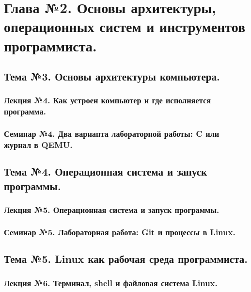 \part{Глава №2. Основы архитектуры, операционных систем и инструментов программиста.}

\chapter{Тема №3. Основы архитектуры компьютера.}
\section{Лекция №4. Как устроен компьютер и где исполняется программа.}

\begingroup
\setlength{\emergencystretch}{2em}


\endgroup


\newpage
\section{Семинар №4. Два варианта лабораторной работы: C или журнал в QEMU.}


\newpage
\chapter{Тема №4. Операционная система и запуск программы.}
\section{Лекция №5. Операционная система и запуск программы.}
\begingroup
\setlength{\emergencystretch}{2em}

\endgroup

\newpage
\section{Семинар №5. Лабораторная работа: Git и процессы в Linux.}
\begingroup
\setlength{\emergencystretch}{2em}

\endgroup

\newpage
\chapter{Тема №5. Linux как рабочая среда программиста.}
\section{Лекция №6. Терминал, shell и файловая система Linux.}

